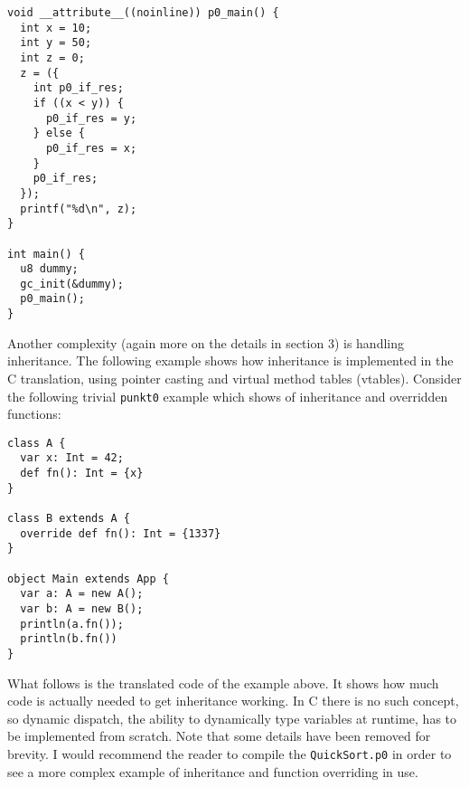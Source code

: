 \begin{lstlisting}
void __attribute__((noinline)) p0_main() {
  int x = 10;
  int y = 50;
  int z = 0;
  z = ({
    int p0_if_res;
    if ((x < y)) {
      p0_if_res = y;
    } else {
      p0_if_res = x;
    }
    p0_if_res;
  });
  printf("%d\n", z);
}

int main() {
  u8 dummy;
  gc_init(&dummy);
  p0_main();
}
\end{lstlisting}
Another complexity (again more on the details in section 3) is handling inheritance. The following example shows how inheritance is implemented in the C translation, using pointer casting and virtual method tables (vtables). Consider the following trivial \texttt{punkt0} example which shows of inheritance and overridden functions:
\begin{lstlisting}
class A {
  var x: Int = 42;
  def fn(): Int = {x}
}

class B extends A {
  override def fn(): Int = {1337}
}

object Main extends App {
  var a: A = new A();
  var b: A = new B();
  println(a.fn());
  println(b.fn())
}
\end{lstlisting}
What follows is the translated code of the example above. It shows how much code is actually needed to get inheritance working. In C there is no such concept, so dynamic dispatch, the ability to dynamically type variables at runtime, has to be implemented from scratch. Note that some details have been removed for brevity. I would recommend the reader to compile the \texttt{QuickSort.p0} in order to see a more complex example of inheritance and function overriding in use.

